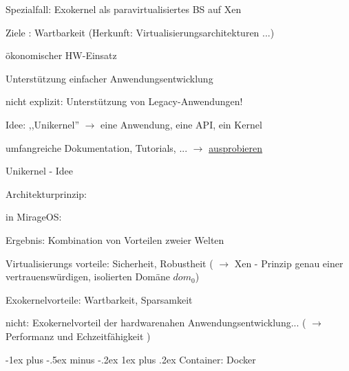 \documentclass[a4paper]{article}
\makeatletter
\renewcommand{\subsubsection}{\@startsection{subsubsection}{3}{0mm}%
 {-1ex plus -.5ex minus -.2ex}%
 {1ex plus .2ex}%
 {\normalfont\small\bfseries}}
\makeatother
\begin{document}
\begin{multicols}{3}
    \begin{itemize*}
        \item
        Spezialfall: Exokernel als paravirtualisiertes BS auf Xen
        \item
        Ziele : Wartbarkeit (Herkunft: Virtualisierungsarchitekturen ...)
        \begin{itemize*}
            \item ökonomischer HW-Einsatz
            \item Unterstützung einfacher Anwendungsentwicklung
            \item nicht explizit: Unterstützung von Legacy-Anwendungen!
        \end{itemize*}
        \item
        Idee: ,,Unikernel'' $\rightarrow$ eine Anwendung, eine
        API, ein Kernel
        \item
        umfangreiche Dokumentation, Tutorials, ...
        $\rightarrow$
        \href{https://mirage.io/wiki/learning}{ausprobieren}
        \item
        Unikernel - Idee
        \begin{itemize*}
            \item Architekturprinzip: %
            \item in MirageOS: %
        \end{itemize*}
        \item
        Ergebnis: Kombination von Vorteilen zweier Welten
        \begin{itemize*}
            \item Virtualisierungs vorteile: Sicherheit, Robustheit ( $\rightarrow$ Xen - Prinzip genau einer vertrauenswürdigen, isolierten Domäne $dom_0$)
            \item Exokernelvorteile: Wartbarkeit, Sparsamkeit
            \item nicht: Exokernelvorteil der hardwarenahen Anwendungsentwicklung... ( $\rightarrow$ Performanz und Echzeitfähigkeit )
        \end{itemize*}
    \end{itemize*}


    \subsubsection{Container: Docker}


\end{multicols}
\end{document}
